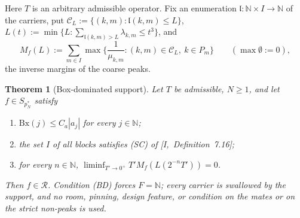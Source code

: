 \documentclass[10pt]{amsart}
\newtheorem{theorem}{Theorem}[section]
\theoremstyle{definition}
\theoremstyle{remark}
\newcommand{\N}{\mathbb N}
\newcommand{\Rec}{\mathcal R}
\begin{document}
Here $T$ is an arbitrary admissible operator.  Fix an enumeration
$\mathfrak l:\N\times I\to\N$ of the carriers, put $\mathcal C_L:=
\{(k,m):\mathfrak l(k,m)\le L\}$,
$L(t):=\min\{L:\sum_{\mathfrak l(k,m)>L}\lambda_{k,m}\le t^3\}$, and
\[
 M_f(L):=\sum_{m\in I}\max\Big\{\frac1{\mu_{k,m}}:(k,m)\in\mathcal C_L,\
 k\in P_m\Big\}\qquad(\max\emptyset:=0),
\]
the inverse margins of the coarse peaks.

\begin{theorem}[Box-dominated support]\label{thm:II-N}
Let $T$ be admissible, $N\ge1$, and let $f\in S_{p_N^*}$ satisfy
\begin{enumerate}
\item[(BD)] $\mathrm{Bx}(j)\le C_a|a_j|$ for every $j\in\N$;
\item[(SC$_I$)] the set $I$ of all blocks satisfies \textup{(SC)} of
[I,~Definition~7.16];
\item[(W$_M$)] for every $n\in\N$, $\liminf_{T'\to0^+}T'M_f(L(2^{-n}T'))=0$.
\end{enumerate}
Then $f\in\Rec$.  Condition \textup{(BD)} forces $F=\N$; every carrier is
swallowed by the support, and no room, pinning, design feature, or
condition on the mates or on the strict non-peaks is used.
\end{theorem}
\end{document}
